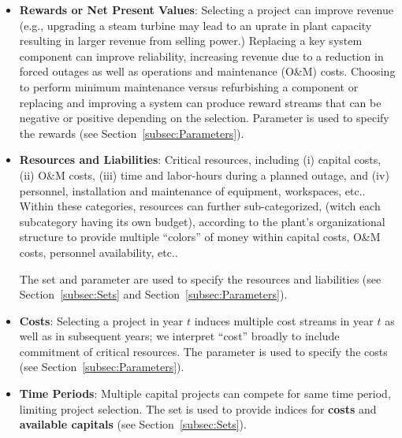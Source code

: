 \begin{itemize}
  \item \textbf{Rewards or Net Present Values}: Selecting a project can improve revenue (e.g.,
  upgrading a steam turbine may lead to an uprate in plant capacity resulting in larger
  revenue from selling power.) Replacing a key system component can improve reliability,
  increasing revenue due to a reduction in forced outages as well as operations and
  maintenance (O\&M) costs. Choosing to perform minimum maintenance versus refurbishing
  a component or replacing and improving a system can produce reward streams that
  can be negative or positive depending on the selection. Parameter
   is used to specify the rewards (see Section~\ref{subsec:Parameters}).

  \item \textbf{Resources and Liabilities}: Critical resources, including (i) capital costs,
  (ii) O\&M costs, (iii) time and labor-hours during a planned outage, and (iv) personnel,
  installation and maintenance of equipment, workspaces, etc.. Within these categories, resources
  can further sub-categorized, (witch each subcategory having its own budget), according to the plant’s organizational
  structure to provide multiple “colors” of money within capital costs, O\&M costs,
  personnel availability, etc.. 
  
  The set  and parameter
   are used to specify the resources and
  liabilities (see Section~\ref{subsec:Sets} and Section~\ref{subsec:Parameters}).

  \item \textbf{Costs}: Selecting a project in year $t$ induces multiple
  cost streams in year $t$ as well as in subsequent years; we interpret “cost” broadly to
  include commitment of critical resources. The parameter  is used to specify
  the costs (see Section~\ref{subsec:Parameters}).

  \item \textbf{Time Periods}: Multiple capital projects can compete for same time period,
  limiting project selection. The set  is used to provide indices for
  \textbf{costs} and \textbf{available capitals} (see Section~\ref{subsec:Sets}).


\end{itemize}
